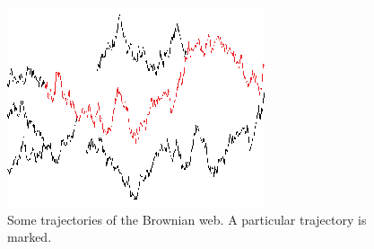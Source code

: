 {\begin{notation}
\end{notation}

\begin{figure}
   \centering
   \includegraphics[scale=2]{sometraj.eps}
   \caption{Some trajectories of the Brownian web. A particular trajectory is marked.}
\end{figure}
}
